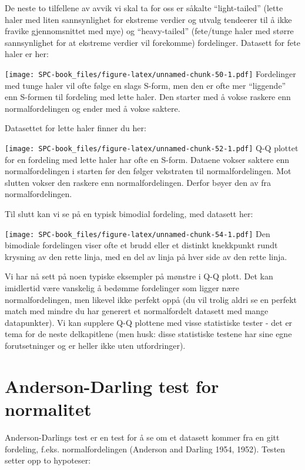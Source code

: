 \documentclass[
]{book}
\begin{document}
De neste to tilfellene av avvik vi skal ta for oss er såkalte ``light-tailed'' (lette haler med liten sannsynlighet for ekstreme verdier og utvalg tendeerer til å ikke fravike gjennomsnittet med mye) og ``heavy-tailed'' (fete/tunge haler med større sannsynlighet for at ekstreme verdier vil forekomme) fordelinger. Datasett for fete haler er her:

\texttt{[image: SPC-book\_files/figure-latex/unnamed-chunk-50-1.pdf]}
Fordelinger med tunge haler vil ofte følge en slags S-form, men den er ofte mer ``liggende'' enn S-formen til fordeling med lette haler. Den starter med å vokse raskere enn normalfordelingen og ender med å vokse saktere.

Datasettet for lette haler finner du her:

\texttt{[image: SPC-book\_files/figure-latex/unnamed-chunk-52-1.pdf]}
Q-Q plottet for en fordeling med lette haler har ofte en S-form. Dataene vokser saktere enn normalfordelingen i starten før den følger vekstraten til normalfordelingen. Mot slutten vokser den raskere enn normalfordelingen. Derfor bøyer den av fra normalfordelingen.

Til slutt kan vi se på en typisk bimodial fordeling, med datasett her:

\texttt{[image: SPC-book\_files/figure-latex/unnamed-chunk-54-1.pdf]}
Den bimodiale fordelingen viser ofte et brudd eller et distinkt knekkpunkt rundt krysning av den rette linja, med en del av linja på hver side av den rette linja.

Vi har nå sett på noen typiske eksempler på mønstre i Q-Q plott. Det kan imidlertid være vanskelig å bedømme fordelinger som ligger nære normalfordelingen, men likevel ikke perfekt oppå (du vil trolig aldri se en perfekt match med mindre du har generert et normalfordelt datasett med mange datapunkter). Vi kan supplere Q-Q plottene med visse statistiske tester - det er tema for de neste delkapitlene (men husk: disse statistiske testene har sine egne forutsetninger og er heller ikke uten utfordringer).

\hypertarget{anderson-darling-test-for-normalitet}{%
\section{Anderson-Darling test for normalitet}\label{anderson-darling-test-for-normalitet}}

Anderson-Darlings test er en test for å se om et datasett kommer fra en gitt fordeling, f.eks. normalfordelingen (Anderson and Darling 1954, 1952). Testen setter opp to hypoteser:
\end{document}

